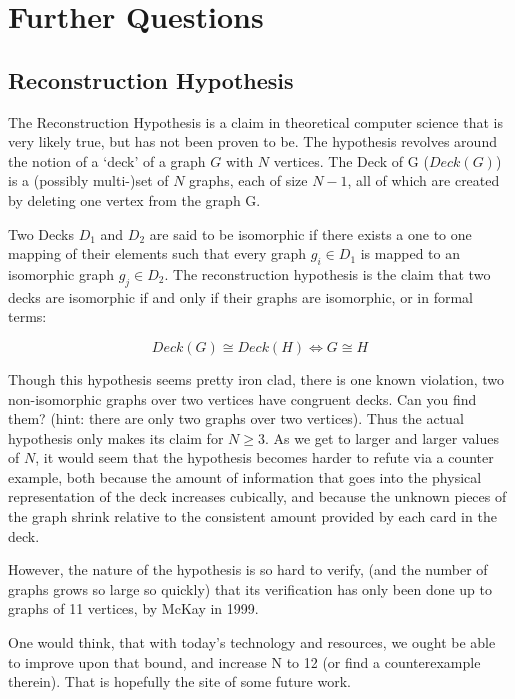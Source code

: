 \chapter{Further Questions}


\section{Reconstruction Hypothesis}

The Reconstruction Hypothesis is a claim in theoretical computer science that is very likely true, but has not been proven to be.
The hypothesis revolves around the notion of a `deck' of a graph $G$ with $N$ vertices.
The Deck of G ($Deck(G)$) is a (possibly multi-)set of $N$ graphs, each of size $N-1$, all of which are created by deleting one vertex from the graph G.

Two Decks $D_1$ and $D_2$ are said to be isomorphic if there exists a one to one mapping of their elements such that every graph $g_i \in D_1$ is mapped to an isomorphic graph $g_j \in D_2$.
The reconstruction hypothesis is the claim that two decks are isomorphic if and only if their graphs are isomorphic, or in formal terms:

$$ Deck(G) \cong Deck(H) \iff G \cong H$$

Though this hypothesis seems pretty iron clad, there is one known violation, two non-isomorphic graphs over two vertices have congruent decks. Can you find them? (hint: there are only two graphs over two vertices).
Thus the actual hypothesis only makes its claim for $N \geq 3$.
As we get to larger and larger values of $N$, it would seem that the hypothesis becomes harder to refute via a counter example, both because the amount of information that goes into the physical representation of the deck increases cubically, and because the unknown pieces of the graph shrink relative to the consistent amount provided by each card in the deck.

However, the nature of the hypothesis is so hard to verify, (and the number of graphs grows so large so quickly) that its verification has only been done up to graphs of 11 vertices, by McKay in 1999.

One would think, that with today's technology and resources, we ought be able to improve upon that bound, and increase N to 12 (or find a counterexample therein).
That is hopefully the site of some future work.